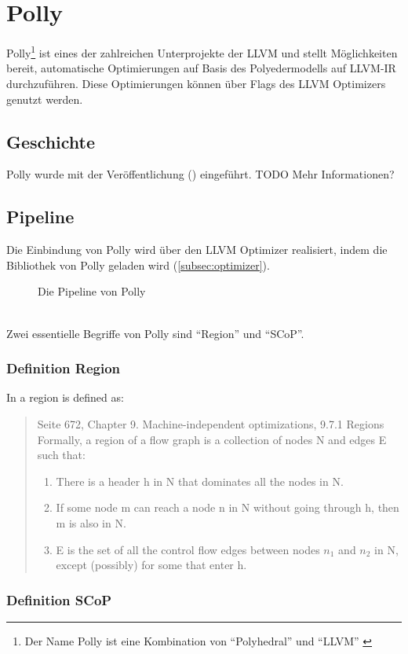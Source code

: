 \chapter{Polly}
Polly\footnote{Der Name Polly ist eine Kombination von \enquote{Polyhedral} und \enquote{\ac{LLVM}} \cite{PollyGrosser}} ist eines der zahlreichen Unterprojekte der \ac{LLVM} und stellt Möglichkeiten bereit, automatische Optimierungen auf Basis des Polyedermodells auf \ac{LLVM-IR} durchzuführen.
Diese Optimierungen können über Flags des \ac{LLVM} Optimizers genutzt werden.
\section{Geschichte}
Polly wurde mit der Veröffentlichung (\cite{PollyGrosser}) eingeführt. TODO Mehr Informationen?

\section{Pipeline \cite{PollyPresentation}}
Die Einbindung von Polly wird über den \ac{LLVM} Optimizer realisiert, indem die Bibliothek von Polly geladen wird (\autoref{subsec:optimizer}).
\begin{figure}[h]
    \caption{Die Pipeline von Polly}
    \centering
\end{figure}\\
Zwei essentielle Begriffe von Polly sind \enquote{Region} und \enquote{\ac{SCoP}}.
\subsection{Definition Region}
In \cite{Drachenbuch} a region is defined as:
\begin{quote} Seite 672, Chapter 9. Machine-independent optimizations, 9.7.1 Regions
    Formally, a region of a flow graph is a collection of nodes N and edges E such that:
    \begin{enumerate}
        \item There is a header h in N that dominates all the nodes in N.
        \item If some node m can reach a node n in N without going through h, then m is also in N.
        \item E is the set of all the control flow edges between nodes \(n_1\) and \(n_2\) in N, except (possibly) for some that enter h.
    \end{enumerate}
\end{quote}
\subsection{Definition SCoP}
